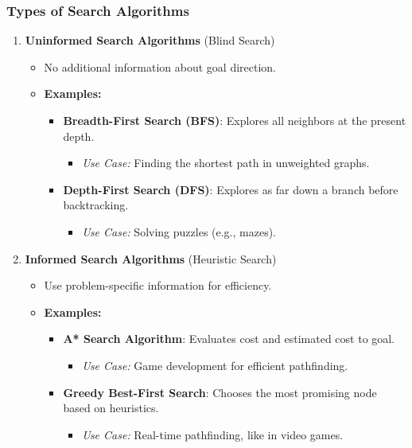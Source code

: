 \documentclass[aspectratio=169]{beamer}
\begin{document}
\begin{frame}[fragile]
    \frametitle{Types of Search Algorithms}
    \begin{enumerate}
        \item \textbf{Uninformed Search Algorithms} (Blind Search)
        \begin{itemize}
            \item No additional information about goal direction.
            \item \textbf{Examples:}
            \begin{itemize}
                \item \textbf{Breadth-First Search (BFS)}: Explores all neighbors at the present depth.
                    \begin{itemize}
                        \item \textit{Use Case:} Finding the shortest path in unweighted graphs.
                    \end{itemize}
                \item \textbf{Depth-First Search (DFS)}: Explores as far down a branch before backtracking.
                    \begin{itemize}
                        \item \textit{Use Case:} Solving puzzles (e.g., mazes).
                    \end{itemize}
            \end{itemize}
        \end{itemize}

        \item \textbf{Informed Search Algorithms} (Heuristic Search)
        \begin{itemize}
            \item Use problem-specific information for efficiency.
            \item \textbf{Examples:}
            \begin{itemize}
                \item \textbf{A* Search Algorithm}: Evaluates cost and estimated cost to goal.
                    \begin{itemize}
                        \item \textit{Use Case:} Game development for efficient pathfinding.
                    \end{itemize}
                \item \textbf{Greedy Best-First Search}: Chooses the most promising node based on heuristics.
                    \begin{itemize}
                        \item \textit{Use Case:} Real-time pathfinding, like in video games.
                    \end{itemize}
            \end{itemize}
        \end{itemize}
        

\end{enumerate}
\end{frame}
\end{document}
